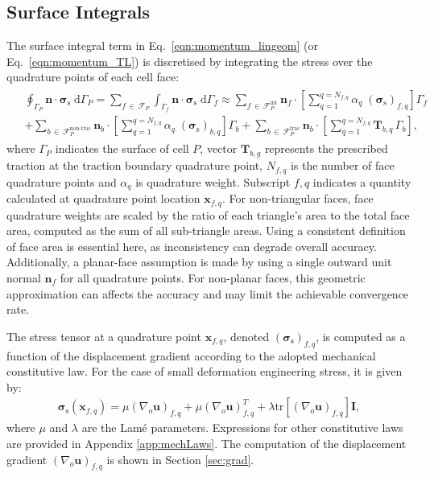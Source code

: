 \documentclass[sn-mathphys,Numbered]{sn-jnl}%
\newcommand{\bb}{\boldsymbol}
\begin{document}
\subsection{Surface Integrals}
\label{sec:surf_int}
%
The surface integral term in Eq.~\eqref{eqn:momentum_lingeom} (or Eq.~\eqref{eqn:momentum_TL}) is discretised by integrating the stress over the quadrature points of each cell face:
%
\begin{eqnarray}\label{eq:divStressDiscret}
\begin{split}
&\oint_{\Gamma_P} \bb{n} \cdot \bb{\sigma}_\text{s} \; \text{d}\Gamma_P
=
\sum_{f \, \in \,\mathcal{F}_P} \int_{\Gamma_f} \bb{n} \cdot \bb{\sigma}_\text{s} \; \text{d}\Gamma_f
\approx
\sum_{f \,\in\, \mathcal{F}_P^{\text{int}}} \bb{n}_{f} \cdot \left [ \sum_{q=1}^{q=N_{f,q}}\alpha_q \; (\bb{\sigma}_\text{s})_{f,q} \right]\Gamma_f \\
& + \sum_{b\, \in \,\mathcal{F}_P^{\text{non-trac}}}  \bb{n}_{b} \cdot \left [ \sum_{q=1}^{q=N_{f,q}}\alpha_q \; (\bb{\sigma}_\text{s})_{b,q} \right]\Gamma_b
+ \sum_{b\, \in \, \mathcal{F}_P^{\text{trac}}}   \bb{n}_{b} \cdot \left[ \sum_{q=1}^{q=N_{f,q}}\bb{T}_{b,q} \,\Gamma_b\right],
\end{split}
\end{eqnarray}
%
where $\Gamma_P$ indicates the surface of cell $P$,
vector $\bb{T}_{b,g}$ represents the prescribed traction at the traction boundary quadrature point,
$N_{f,q}$ is the number of face quadrature points and
$\alpha_q$ is quadrature weight. Subscript ${f,q}$ indicates a quantity calculated at quadrature point location $\bb{x}_{f,q}$.
For non-triangular faces, face quadrature weights are scaled by the ratio of each triangle’s area to the total face area,
computed as the sum of all sub-triangle areas. Using a consistent definition of face area is essential here,
as inconsistency can degrade overall accuracy.
Additionally, a planar-face assumption is made by using a single outward unit normal \(\bb{n}_f\) for all quadrature points.
For non-planar faces, this geometric approximation can affects the accuracy and may limit the achievable convergence rate.

The stress tensor at a quadrature point $\bb{x}_{f,q}$, denoted $(\bb{\sigma}_\text{s})_{f,q}$, is computed as a function of the displacement gradient according to the adopted mechanical constitutive law.
For the case of small deformation engineering stress, it is given by:
\begin{eqnarray}
\bb{\sigma}_\text{s}(\bb{x}_{f,q}) =   \mu (\nabla_o \bb{u})_{f,q} + \mu (\nabla_o \bb{u})^T_{f,q} +\lambda \text{tr}\left[(\nabla_o \bb{u})_{f,q} \right]\bb{I},
\end{eqnarray}
where $\mu$ and $\lambda$ are the Lamé parameters.
Expressions for other constitutive laws are provided in Appendix \ref{app:mechLaws}.
The computation of the displacement gradient $(\nabla_o \bb{u})_{f,q}$ is shown in Section \ref{sec:grad}.
%
\end{document}
